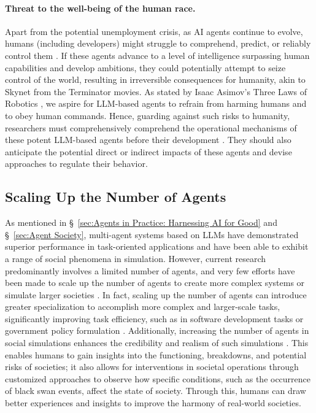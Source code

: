 \paragraph{Threat to the well-being of the human race.}
Apart from the potential unemployment crisis, as AI agents continue to evolve, humans (including developers) might struggle to comprehend, predict, or reliably control them \cite{yao2023impact}. 
If these agents advance to a level of intelligence surpassing human capabilities and develop ambitions, they could potentially attempt to seize control of the world, resulting in irreversible consequences for humanity, akin to Skynet from the Terminator movies.
As stated by Isaac Asimov's Three Laws of Robotics \cite{asimov1941three}, we aspire for LLM-based agents to refrain from harming humans and to obey human commands. 
Hence, guarding against such risks to humanity, researchers must comprehensively comprehend the operational mechanisms of these potent LLM-based agents before their development \cite{elhage2021mathematical}. 
They should also anticipate the potential direct or indirect impacts of these agents and devise approaches to regulate their behavior.

\subsection{Scaling Up the Number of Agents}\label{sec:Scaling Up the Number of Agents}
As mentioned in \S \ \ref{sec:Agents in Practice:  Harnessing AI for Good} and \S \ \ref{sec:Agent Society}, multi-agent systems based on LLMs have demonstrated superior performance in task-oriented applications and have been able to exhibit a range of social phenomena in simulation. 
However, current research predominantly involves a limited number of agents, and very few efforts have been made to scale up the number of agents to create more complex systems or simulate larger societies \cite{DBLP:journals/corr/abs-2305-17066,DBLP:journals/corr/abs-2308-11136}.
In fact, scaling up the number of agents can introduce greater specialization to accomplish more complex and larger-scale tasks, significantly improving task efficiency, such as in software development tasks or government policy formulation \cite{DBLP:journals/corr/abs-2307-07924}. 
Additionally, increasing the number of agents in social simulations enhances the credibility and realism of such simulations \cite{DBLP:journals/corr/abs-2304-03442}. 
This enables humans to gain insights into the functioning, breakdowns, and potential risks of societies; it also allows for interventions in societal operations through customized approaches to observe how specific conditions, such as the occurrence of black swan events, affect the state of society. Through this, humans can draw better experiences and insights to improve the harmony of real-world societies.


